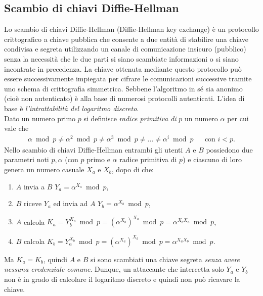 \subsection{Scambio di chiavi Diffie-Hellman}
Lo scambio di chiavi Diffie-Hellman (Diffie-Hellman key exchange) è un protocollo crittografico a chiave pubblica che consente a due entità di stabilire una chiave condivisa e segreta utilizzando un canale di comunicazione insicuro (pubblico) senza la necessità che le due parti si siano scambiate informazioni o si siano incontrate in precedenza. La chiave ottenuta mediante questo protocollo può essere successivamente impiegata per cifrare le comunicazioni successive tramite uno schema di crittografia simmetrica. Sebbene l'algoritmo in sé sia anonimo (cioè non autenticato) è alla base di numerosi protocolli autenticati. L'idea di base è \textit{l'intrattabilità del logaritmo discreto}.\\
Dato un numero primo $p$ si definisce \textit{radice primitiva di} $p$ un numero $\alpha$ per cui vale che
\begin{align*}
\alpha\bmod p \neq \alpha^2\bmod p \neq \alpha^3\bmod p \neq \dots \neq \alpha^i\bmod p && \text{con } i < p.
\end{align*}
Nello scambio di chiavi Diffie-Hellman entrambi gli utenti $A$ e $B$ possiedono due parametri noti $p, \alpha$ (con $p$ primo e $\alpha$ radice primitiva di $p$) e ciascuno di loro genera un numero casuale $X_a$ e $X_b$, dopo di che:
\begin{enumerate}
	\item $A$ invia a $B$ $Y_a=\alpha^{X_a}\bmod p$,
	\item $B$ riceve $Y_a$ ed invia ad $A$ $Y_b=\alpha^{X_b}\bmod p$,
	\item $A$ calcola $K_a=Y_b^{X_a}\bmod p = (\alpha^{X_b})^{X_a}\bmod p = \alpha^{X_b X_a}\bmod p$,
	\item $B$ calcola $K_b=Y_a^{X_b}\bmod p = (\alpha^{X_a})^{X_b}\bmod p = \alpha^{X_a X_b}\bmod p$.
\end{enumerate}
Ma $K_a = K_b$, quindi $A$ e $B$ si sono scambiati una chiave segreta \textit{senza avere nessuna credenziale comune}. Dunque, un attaccante che intercetta solo $Y_a$ e $Y_b$ non è in grado di calcolare il logaritmo discreto e quindi non può ricavare la chiave.

